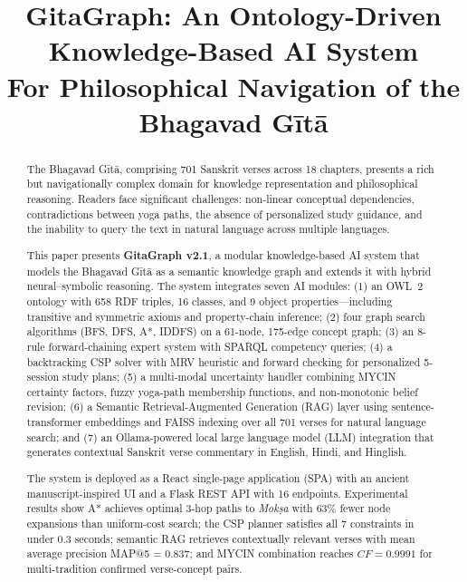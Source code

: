 \documentclass[conference]{IEEEtran}
\begin{document}
\title{GitaGraph: An Ontology-Driven Knowledge-Based AI System\\
For Philosophical Navigation of the Bhagavad G\={i}t\={a}}

\author{
}

\maketitle

\begin{abstract}
The Bhagavad G\={i}t\={a}, comprising 701 Sanskrit verses across 18 chapters,
presents a rich but navigationally complex domain for knowledge representation
and philosophical reasoning. Readers face significant challenges: non-linear
conceptual dependencies, contradictions between yoga paths, the absence of
personalized study guidance, and the inability to query the text in natural
language across multiple languages.

This paper presents \textbf{GitaGraph v2.1}, a modular knowledge-based AI
system that models the Bhagavad G\={i}t\={a} as a semantic knowledge graph
and extends it with hybrid neural--symbolic reasoning. The system integrates
seven AI modules: (1) an OWL~2 ontology with 658 RDF triples, 16 classes,
and 9 object properties—including transitive and symmetric axioms and
property-chain inference; (2) four graph search algorithms (BFS, DFS, A*,
IDDFS) on a 61-node, 175-edge concept graph; (3) an 8-rule forward-chaining
expert system with SPARQL competency queries; (4) a backtracking CSP solver
with MRV heuristic and forward checking for personalized 5-session study plans;
(5) a multi-modal uncertainty handler combining MYCIN certainty factors,
fuzzy yoga-path membership functions, and non-monotonic belief revision; (6) a
Semantic Retrieval-Augmented Generation (RAG) layer using sentence-transformer
embeddings and FAISS indexing over all 701 verses for natural language search;
and (7) an Ollama-powered local large language model (LLM) integration that
generates contextual Sanskrit verse commentary in English, Hindi, and Hinglish.

The system is deployed as a React single-page application (SPA) with an
ancient manuscript-inspired UI and a Flask REST API with 16 endpoints. Experimental
results show A* achieves optimal 3-hop paths to \textit{Mok\d{s}a} with 63\%
fewer node expansions than uniform-cost search; the CSP planner satisfies all 7
constraints in under 0.3 seconds; semantic RAG retrieves contextually relevant
verses with mean average precision MAP@5 = 0.837; and MYCIN combination reaches
$CF = 0.9991$ for multi-tradition confirmed verse-concept pairs.
\end{abstract}
\end{document}
